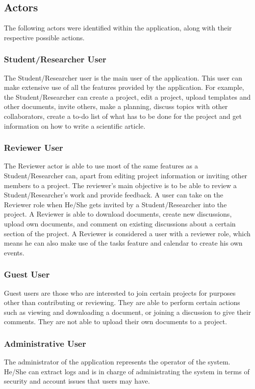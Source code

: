 \subsection{Actors} %
\label{sub:actors}
The following actors were identified within the application, along with their respective possible actions.
\subsubsection{Student/Researcher User} 
The Student/Researcher user is the main user of the application. This user can make extensive use of all the features provided by the application. For example, the Student/Researcher can create a project, edit a project, upload templates and other documents, invite others, make a planning, discuss topics with other collaborators, create a to-do list of what has to be done for the project and get information on how to write a scientific article.

\subsubsection{Reviewer User} 
The Reviewer actor is able to use most of the same features as a Student/Researcher can, apart from editing project information or inviting other members to a project. The reviewer's main objective is to be able to review a Student/Researcher's work and provide feedback. A user can take on the Reviewer role when He/She gets invited by a Student/Researcher into the project. A Reviewer is able to download documents, create new discussions, upload own documents, and comment on existing discussions about a certain section of the project. A Reviewer is considered a user with a reviewer role, which means he can also make use of the tasks feature and calendar to create his own events.

\subsubsection{Guest User} 
Guest users are those who are interested to join certain projects for purposes other than contributing or reviewing. They are able to perform certain actions such as viewing and downloading a document, or joining a discussion to give their comments. They are not able to upload their own documents to a project.

\subsubsection{Administrative User} 
The administrator of the application represents the operator of the system. He/She can extract logs and is in charge of administrating the system in terms of security and account issues that users may have.

